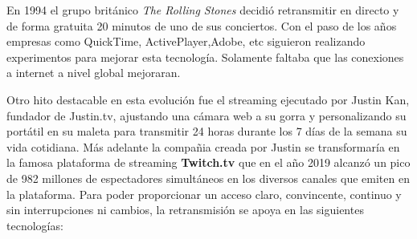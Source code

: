 En 1994 el grupo brit\'anico \textit{The Rolling Stones} decidi\'o retransmitir en directo y de forma gratuita 20 minutos de uno de sus conciertos. Con el paso de los a\~nos empresas como QuickTime, ActivePlayer,Adobe, etc siguieron realizando experimentos para mejorar esta tecnolog\'ia. Solamente faltaba que las conexiones a internet a nivel global mejoraran. \par

Otro hito destacable en esta evoluci\'on fue el streaming ejecutado por Justin Kan, fundador de Justin.tv, ajustando una c\'amara web a su gorra y personalizando su port\'atil en su maleta para transmitir 24 horas durante los 7 d\'ias de la semana su vida cotidiana. M\'as adelante la compa\~nia creada por Justin se transformar\'ia en la famosa plataforma de streaming \textbf{Twitch.tv} que en el a\~no 2019 alcanz\'o un pico de 982 millones de espectadores simult\'aneos en los diversos canales que emiten en la plataforma. Para poder proporcionar un acceso claro, convincente, continuo y sin interrupciones ni cambios, la retransmisi\'on se apoya en las siguientes tecnolog\'ias:
